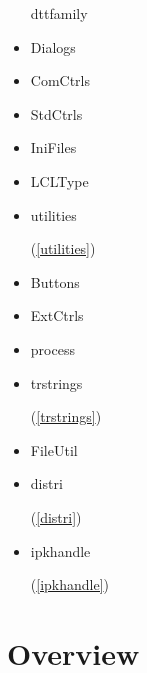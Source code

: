 \documentclass{report}
\begin{document}
\begin{itemize}
d{ttfamily}\item \begin{ttfamily}Dialogs\end{ttfamily}\item \begin{ttfamily}ComCtrls\end{ttfamily}\item \begin{ttfamily}StdCtrls\end{ttfamily}\item \begin{ttfamily}IniFiles\end{ttfamily}\item \begin{ttfamily}LCLType\end{ttfamily}\item \begin{ttfamily}utilities\end{ttfamily}(\ref{utilities})\item \begin{ttfamily}Buttons\end{ttfamily}\item \begin{ttfamily}ExtCtrls\end{ttfamily}\item \begin{ttfamily}process\end{ttfamily}\item \begin{ttfamily}trstrings\end{ttfamily}(\ref{trstrings})\item \begin{ttfamily}FileUtil\end{ttfamily}\item \begin{ttfamily}distri\end{ttfamily}(\ref{distri})\item \begin{ttfamily}ipkhandle\end{ttfamily}(\ref{ipkhandle})\end{itemize}
\section{Overview}
\begin{description}
\item[\texttt{\begin{ttfamily}TRMForm\end{ttfamily} Class}]
\end{description}
\end{document}
